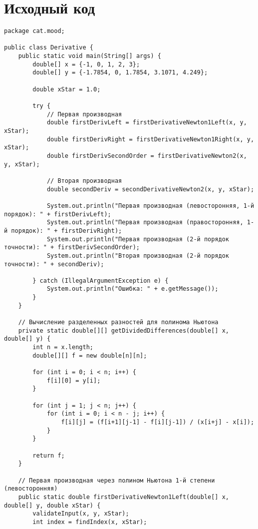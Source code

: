 \section*{Исходный код}

\begin{verbatim}
package cat.mood;

public class Derivative {
    public static void main(String[] args) {
        double[] x = {-1, 0, 1, 2, 3};
        double[] y = {-1.7854, 0, 1.7854, 3.1071, 4.249};

        double xStar = 1.0;

        try {
            // Первая производная
            double firstDerivLeft = firstDerivativeNewton1Left(x, y, xStar);
            double firstDerivRight = firstDerivativeNewton1Right(x, y, xStar);
            double firstDerivSecondOrder = firstDerivativeNewton2(x, y, xStar);

            // Вторая производная
            double secondDeriv = secondDerivativeNewton2(x, y, xStar);

            System.out.println("Первая производная (левосторонняя, 1-й порядок): " + firstDerivLeft);
            System.out.println("Первая производная (правосторонняя, 1-й порядок): " + firstDerivRight);
            System.out.println("Первая производная (2-й порядок точности): " + firstDerivSecondOrder);
            System.out.println("Вторая производная (2-й порядок точности): " + secondDeriv);

        } catch (IllegalArgumentException e) {
            System.out.println("Ошибка: " + e.getMessage());
        }
    }

    // Вычисление разделенных разностей для полинома Ньютона
    private static double[][] getDividedDifferences(double[] x, double[] y) {
        int n = x.length;
        double[][] f = new double[n][n];

        for (int i = 0; i < n; i++) {
            f[i][0] = y[i];
        }

        for (int j = 1; j < n; j++) {
            for (int i = 0; i < n - j; i++) {
                f[i][j] = (f[i+1][j-1] - f[i][j-1]) / (x[i+j] - x[i]);
            }
        }

        return f;
    }

    // Первая производная через полином Ньютона 1-й степени (левосторонняя)
    public static double firstDerivativeNewton1Left(double[] x, double[] y, double xStar) {
        validateInput(x, y, xStar);
        int index = findIndex(x, xStar);


\end{verbatim}
